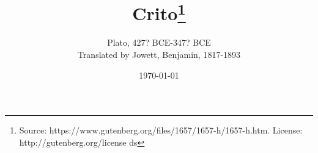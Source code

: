 \documentclass[11pt,letter]{article}
\begin{document}
\title{Crito\thanks{Source: https://www.gutenberg.org/files/1657/1657-h/1657-h.htm. License: http://gutenberg.org/license ds}}
\date{\today}
\author{Plato, 427? BCE-347? BCE\\ Translated by Jowett, Benjamin, 1817-1893}
\maketitle

\setcounter{tocdepth}{1}
\tableofcontents
\renewcommand{\baselinestretch}{1.0}
\normalsize
\newpage


\par 
\end{document}
